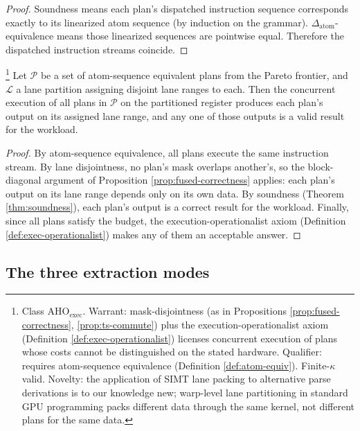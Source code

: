 \begin{proof}
  Soundness means each plan's dispatched
  instruction sequence corresponds exactly to its
  linearized atom sequence (by induction on the
  grammar). $\Delta_\mathrm{atom}$-equivalence
  means those linearized sequences are pointwise
  equal. Therefore the dispatched instruction
  streams coincide.
\end{proof}

\begin{theorem}
  \label{thm:parse-packing}
  \footnote{Class \textsf{AHO}$_{\mathrm{exec}}$.
  Warrant: mask-disjointness (as in
  Propositions \ref{prop:fused-correctness},
  \ref{prop:ts-commute}) plus the
  execution-operationalist axiom
  (Definition \ref{def:exec-operationalist})
  licenses concurrent execution of plans whose
  costs cannot be distinguished on the stated
  hardware. Qualifier: requires atom-sequence
  equivalence (Definition \ref{def:atom-equiv}).
  Finite-$\kappa$ valid. Novelty: the application of
  SIMT lane packing to alternative parse derivations
  is to our knowledge new; warp-level lane
  partitioning in standard GPU programming packs
  different data through the same kernel, not
  different plans for the same data.}
  Let $\mathcal{P}$ be a set of atom-sequence
  equivalent plans from the Pareto frontier, and
  $\mathcal{L}$ a lane partition assigning disjoint
  lane ranges to each. Then the concurrent
  execution of all plans in $\mathcal{P}$ on the
  partitioned register produces each plan's output
  on its assigned lane range, and any one of those
  outputs is a valid result for the workload.
\end{theorem}

\begin{proof}
  By atom-sequence equivalence, all plans execute
  the same instruction stream. By lane disjointness,
  no plan's mask overlaps another's, so the
  block-diagonal argument of Proposition
  \ref{prop:fused-correctness} applies: each plan's
  output on its lane range depends only on its own
  data. By soundness (Theorem \ref{thm:soundness}),
  each plan's output is a correct result for the
  workload. Finally, since all plans satisfy the
  budget, the execution-operationalist axiom
  (Definition \ref{def:exec-operationalist}) makes
  any of them an acceptable answer.
\end{proof}

\subsection{The three extraction modes}

